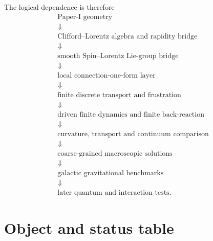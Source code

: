\documentclass[11pt,a4paper]{article}
\theoremstyle{remark}
\begin{document}
The logical dependence is therefore
\begin{equation}
\boxed{
\begin{gathered}
\text{Paper-I geometry}\\
\Downarrow\\
\text{Clifford--Lorentz algebra and rapidity bridge}\\
\Downarrow\\
\text{smooth Spin--Lorentz Lie-group bridge}\\
\Downarrow\\
\text{local connection-one-form layer}\\
\Downarrow\\
\text{finite discrete transport and frustration}\\
\Downarrow\\
\text{driven finite dynamics and finite back-reaction}\\
\Downarrow\\
\text{curvature, transport and continuum comparison}\\
\Downarrow\\
\text{coarse-grained macroscopic solutions}\\
\Downarrow\\
\text{galactic gravitational benchmarks}\\
\Downarrow\\
\text{later quantum and interaction tests}.
\end{gathered}}
\tag{7.9}
\end{equation}

\section{Object and status table}
\end{document}
